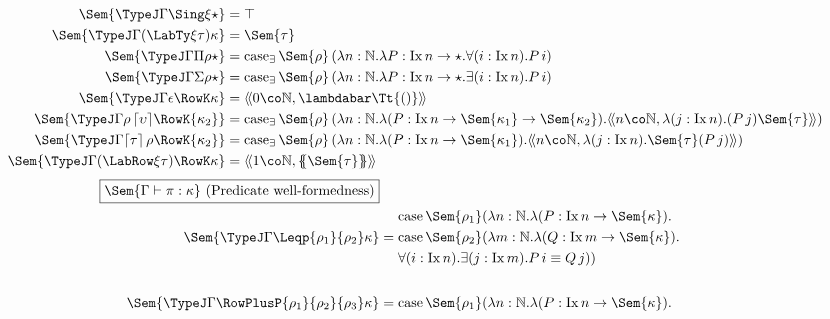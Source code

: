 \documentclass[authoryear,acmsmall,screen]{acmart}
\newcommand\Absurd{\ensuremath{\lambdabar\mathrm{\Tt{()}}}}
\newcommand\Nat{\mathbb{N}}
\newcommand\Ix[1]{\mathrm{Ix} \, #1}
\newcommand\Ixed[1]{\ensuremath{\Sem{#1}}}
\newcommand\TyPair[3]{\ensuremath{\langle\!\langle #1 \co #2 , #3 \rangle\!\rangle}}
\newcommand\Lift[1]{\ensuremath{\lceil #1 \rceil}}
\renewcommand\Case{\mathrm{case}}
\newcommand\CaseP[2]{\ensuremath{\Case_{\mathrm{\exists}} \, #1 \, #2 }}
\newcommand\Felim[1]{\{\!\!\{#1\}\!\!\}}
\begin{document}
\begin{figure}[H]
\begin{gather*}
\begin{align*}
\Ixed{\TypeJ \Gamma {\Sing \xi} \star} &= \top  \\
\Ixed{\TypeJ \Gamma {(\LabTy \xi \tau)} \kappa}&= \Ixed{\tau}  \\
\Ixed{\TypeJ \Gamma {\Pi \rho} \star}&= \CaseP {\Ixed{\rho}} {(\lambda n : \Nat. \lambda P : \Ix{n} \to \star. \forall (i : \Ix{n}). P \, i)}\\
\Ixed{\TypeJ \Gamma {\Sigma \rho} \star}&= \CaseP {\Ixed{\rho}} {(\lambda n : \Nat. \lambda P : \Ix{n} \to \star. \exists (i : {\Ix n}). P \, i)}\\
\Ixed{\TypeJ \Gamma \epsilon {\RowK \kappa}} &= \TyPair 0 \Nat \Absurd \\
\Ixed{\TypeJ \Gamma {\rho \, \Lift{\upsilon}} {\RowK {\kappa_{2}}}} &= \CaseP {\Ixed \rho} {(\lambda n : \Nat. \lambda (P : \Ix n \to \Sem{\kappa_{1}} \to \Sem{\kappa_{2}}).  \TyPair {n} {\Nat} {\lambda (j : \Ix n). (P \, j) \Sem{\tau} })} \\
\Ixed{\TypeJ \Gamma {\Lift{\tau} \, \rho} {\RowK {\kappa_{2}}}} &= \CaseP {\Ixed \rho} {(\lambda n : \Nat. \lambda (P : \Ix n \to \Sem{\kappa_{1}}).  \TyPair {n} {\Nat} {\lambda (j : \Ix n). \Sem{\tau} (P \, j) })} \\
\Ixed{\TypeJ \Gamma {(\LabRow \xi \tau)} {\RowK \kappa}}&= \TyPair {1} {\Nat} {\Felim{\Sem{\tau}}}
\end{align*}
\end{gather*}
\begin{align*}
\fbox{$\Ixed{\Gamma \vdash \pi : \kappa}$ (Predicate well-formedness)} \\
\vspace{5em}
\Ixed{\TypeJ \Gamma {\Leqp {\rho_{1}} {\rho_{2}}} \kappa} &=
  \begin{aligned}
              &\Case\, {\Ixed{\rho_{1}}} (\lambda n : \Nat. \lambda (P : \Ix n \to \Ixed{\kappa}).  \\
              &\Case\, {\Ixed{\rho_{2}}} (\lambda m : \Nat. \lambda (Q : \Ix m \to \Ixed{\kappa}). \\                               
              &\forall (i : \Ix n). \exists (j : \Ix m). P \, i \equiv Q \, j))
  \end{aligned} \\ \\
\Ixed{\TypeJ \Gamma {\RowPlusP {\rho_{1}} {\rho_{2}} {\rho_{3}}} \kappa} &= 
  \begin{aligned}                                           
              &\Case\, {\Ixed{\rho_{1}}} (\lambda n : \Nat. \lambda (P : \Ix n \to \Ixed{\kappa}).  \\

\end{aligned}
\end{align*}
\end{figure}
\end{document}
